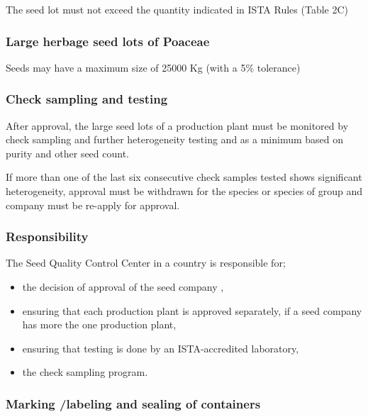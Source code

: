 \documentclass[
]{book}
\providecommand{\tightlist}{%
  \setlength{\itemsep}{0pt}\setlength{\parskip}{0pt}}
\begin{document}
The seed lot must not exceed the quantity indicated in ISTA Rules (Table 2C)

\hypertarget{large-herbage-seed-lots-of-poaceae}{%
\subsubsection{Large herbage seed lots of Poaceae}\label{large-herbage-seed-lots-of-poaceae}}

Seeds may have a maximum size of 25000 Kg (with a 5\% tolerance)

\hypertarget{check-sampling-and-testing}{%
\subsubsection{Check sampling and testing}\label{check-sampling-and-testing}}

After approval, the large seed lots of a production plant must be monitored by check sampling and further heterogeneity testing and as a minimum based on purity and other seed count.

If more than one of the last six consecutive check samples tested shows significant heterogeneity, approval must be withdrawn for the species or species of group and company must be re-apply for approval.

\hypertarget{responsibility}{%
\subsubsection{Responsibility}\label{responsibility}}

The Seed Quality Control Center in a country is responsible for;

\begin{itemize}
\tightlist
\item
  the decision of approval of the seed company ,
\item
  ensuring that each production plant is approved separately, if a seed company has more the one production plant,
\item
  ensuring that testing is done by an ISTA-accredited laboratory,
\item
  the check sampling program.
\end{itemize}

\hypertarget{marking-labeling-and-sealing-of-containers}{%
\subsubsection{Marking /labeling and sealing of containers}\label{marking-labeling-and-sealing-of-containers}}
\end{document}
